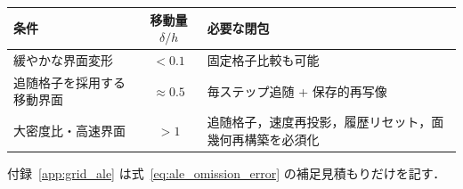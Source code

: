 \begin{center}
\PaperTableSetup
\begin{tabular}{>{\raggedright\arraybackslash}p{50mm}c>{\raggedright\arraybackslash}p{44mm}}
\hline
条件 & 移動量 $\delta/h$ & 必要な閉包 \\
\hline
緩やかな界面変形 & $<0.1$ & 固定格子比較も可能 \\
追随格子を採用する移動界面 & $\approx0.5$ & 毎ステップ追随 + 保存的再写像 \\
大密度比・高速界面 & $>1$ & 追随格子，速度再投影，履歴リセット，面幾何再構築を必須化 \\
\hline
\end{tabular}
\end{center}

付録~\ref{app:grid_ale} は式~\eqref{eq:ale_omission_error} の補足見積もりだけを記す．

